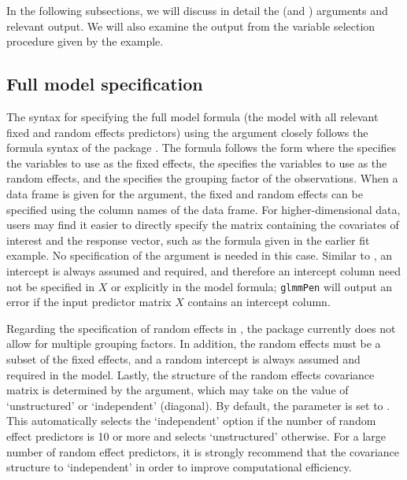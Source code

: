In the following subsections, we will discuss in detail the  (and ) arguments and relevant output. We will also examine the output from the variable selection procedure given by the  example.


\subsection{Full model specification}
\label{sec:model-specification}

The syntax for specifying the full model formula (the model with all relevant fixed and random effects predictors) using the  argument closely follows the formula syntax of
the  package \citep{lme42007}. The formula follows the form
where the  specifies the variables to use as the fixed
effects, the  specifies the variables to use as the
random effects, and the  specifies the grouping factor of
the observations. When a data frame is given for the 
argument, the fixed and random effects can be specified using the column
names of the data frame. For higher-dimensional data, users
may find it easier to directly specify the matrix containing the covariates of interest and the response vector, such as the
 formula
given in the earlier  fit example. No specification of
the  argument is needed in this case. Similar to , an intercept is always assumed and required, and therefore an intercept column need not be specified in $X$ or explicitly in the model formula; \texttt{glmmPen} will output an error if the input predictor matrix $X$ contains an intercept column. 

Regarding the specification of random effects in , the  package currently does not allow for multiple grouping factors.  In addition, the random effects must be a subset of the fixed effects, and a random intercept is always assumed and required in the model. Lastly, the structure of the random effects covariance matrix is determined by the  argument, which may take on the value of  `unstructured' or `independent' (diagonal). By default, the  parameter is set to . This automatically selects the `independent' option if the number of random effect predictors is 10 or more and selects  `unstructured' otherwise. For a large number of random effect predictors, it is strongly recommend that the covariance structure to `independent' in order to improve computational efficiency.

